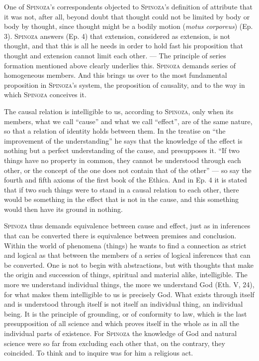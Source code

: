 \documentclass[12pt]{article}
\newcommand{\opage}[1]{\marginnote{\footnotesize\textit{[#1]}}}
\begin{document}
One of \textsc{Spinoza}'s correspondents objected to \textsc{Spinoza}'s definition
of attribute that it was not, after all, beyond doubt that thought could not be
limited by body or body by thought, since thought might be a bodily motion
(\textit{motus corporeus}) (Ep. 3). \textsc{Spinoza} answers (Ep. 4) that
extension, considered as extension, is not thought, and that this is all he needs
in order to hold fast his proposition that thought and extension cannot limit each
other. --- The principle of series formation mentioned above clearly underlies
this. \textsc{Spinoza} demands series of homogeneous members. And this brings us
over to the most fundamental proposition in \textsc{Spinoza}'s system, the
proposition of causality, and to the way in which \textsc{Spinoza} conceives it.

The causal relation is intelligible to us, according to \textsc{Spinoza}, only when
its members, what we call ``cause'' and what we call ``effect'', are of the same
nature, so that a relation of identity holds between them. In the treatise on ``the
improvement of the understanding'' he says that the knowledge of the effect is
nothing but a perfect understanding of the cause, and presupposes it. ``If two
things have no property in common, they cannot be understood through each other,
or the concept of the one does not contain that of the other'' --- so say the
fourth and fifth axioms of the first book of the Ethica. And in Ep. 4 it is stated
that if two such things were to stand in a causal relation to each other, there
would be something in the effect that is not in the cause, and this something
would then have its ground in nothing.

\textsc{Spinoza} thus demands equivalence between cause and effect, just as in
inferences that can be converted there is equivalence between premises and
conclusion. Within the world of phenomena (things) he wants to find a connection as
strict and logical as that between the members of a series of logical inferences
that can \opage{11}be converted. One is not to begin with abstractions, but with
thoughts that make the origin and succession of things, spiritual and material
alike, intelligible. The more we understand individual things, the more we
understand God (Eth. V, 24), for what makes them intelligible to us is precisely
God. What exists through itself and is understood through itself is not itself an
individual thing, an individual being. It is the principle of grounding, or of
conformity to law, which is the last presupposition of all science and which
proves itself in the whole as in all the individual parts of existence. For
\textsc{Spinoza} the knowledge of God and natural science were so far from excluding
each other that, on the contrary, they coincided. To think and to inquire was for
him a religious act.
\end{document}
